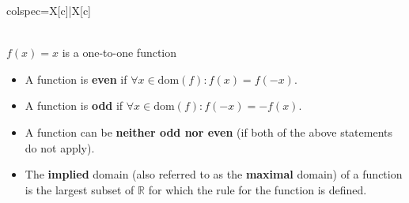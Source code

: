 \documentclass[12pt,a4paper,titlepage]{article}
\begin{document}
\begin{SummaryBox}[title=Types of functions (many/one-to-one)]
\begin{SummaryExtensionBox}[title=Horizontal line test, center lower]
\begin{tblr}{colspec={X[c]|X[c]}}
                        {\\
                        $f(x)=x$ is a one-to-one function}
                    \end{tblr}
                \end{SummaryExtensionBox}
            \end{SummaryBox}
            
            \begin{SummaryBox}[title=Parity of functions]
                \begin{itemize}[leftmargin=*]
                    \item A function is \textbf{even} if $\forall x \in \text{dom}(f): f(x) = f(-x)$.
                    \item A function is \textbf{odd} if $\forall x \in \text{dom}(f): f(-x) = -f(x)$.
                    \item A function can be \textbf{neither odd nor even} (if both of the above statements do not apply).
                \end{itemize}
            \end{SummaryBox}
            
            \begin{SummaryBox}[title=Implied/maximal domain]
                \begin{itemize}[leftmargin=*]
                    \item The \textbf{implied} domain (also referred to as the \textbf{maximal} domain) of a function is the largest subset of $\mathbb{R}$ for which the rule for the function is defined.
                \end{itemize}
            \end{SummaryBox}
            
\end{document}
